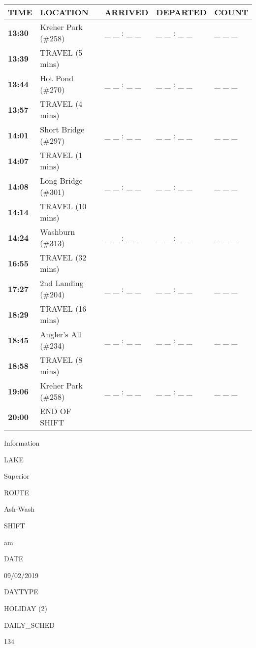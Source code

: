 \documentclass[]{article}
\begin{document}
\begin{tabular}{>{\bfseries}lllll}
\toprule
\textbf{TIME} & \textbf{LOCATION} & \textbf{ARRIVED} & \textbf{DEPARTED} & \textbf{COUNT}\\
\midrule
13:30 & Kreher Park (\#258) & \_ \_ : \_ \_ & \_ \_ : \_ \_ & \_ \_ \_\\
13:39 & TRAVEL (5 mins) &  &  & \\
13:44 & Hot Pond (\#270) & \_ \_ : \_ \_ & \_ \_ : \_ \_ & \_ \_ \_\\
13:57 & TRAVEL (4 mins) &  &  & \\
14:01 & Short Bridge (\#297) & \_ \_ : \_ \_ & \_ \_ : \_ \_ & \_ \_ \_\\
14:07 & TRAVEL (1 mins) &  &  & \\
14:08 & Long Bridge (\#301) & \_ \_ : \_ \_ & \_ \_ : \_ \_ & \_ \_ \_\\
14:14 & TRAVEL (10 mins) &  &  & \\
14:24 & Washburn (\#313) & \_ \_ : \_ \_ & \_ \_ : \_ \_ & \_ \_ \_\\
16:55 & TRAVEL (32 mins) &  &  & \\
17:27 & 2nd Landing (\#204) & \_ \_ : \_ \_ & \_ \_ : \_ \_ & \_ \_ \_\\
18:29 & TRAVEL (16 mins) &  &  & \\
18:45 & Angler's All (\#234) & \_ \_ : \_ \_ & \_ \_ : \_ \_ & \_ \_ \_\\
18:58 & TRAVEL (8 mins) &  &  & \\
19:06 & Kreher Park (\#258) & \_ \_ : \_ \_ & \_ \_ : \_ \_ & \_ \_ \_\\
20:00 & END OF SHIFT &  &  & \\
\bottomrule
\end{tabular}\newpage

Information

LAKE

Superior

ROUTE

Ash-Wash

SHIFT

am

DATE

09/02/2019

DAYTYPE

HOLIDAY (2)

DAILY\_SCHED

134

\vspace{24pt}
\end{document}
